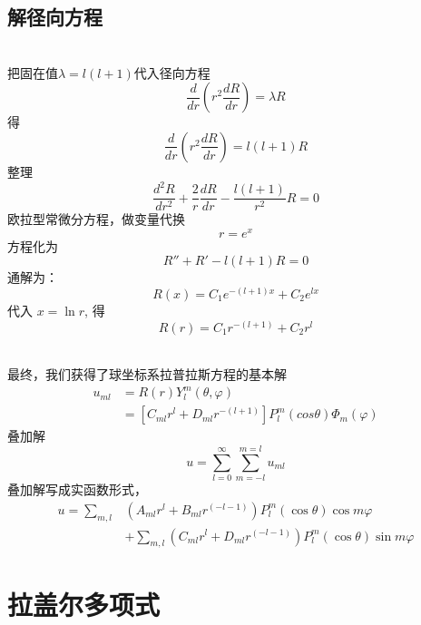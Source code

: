 	
	\subsection{解径向方程} 
	~\\
	把固在值$ \lambda =l(l+1)$代入径向方程
	\begin{equation*}
		\frac{d}{d r} (r^2\frac{d R }{d r} ) =\lambda R
	\end{equation*}	
	得
	\begin{equation*}
		\frac{d}{d r} (r^2\frac{d R }{d r} ) =l(l+1) R
	\end{equation*}
	整理	
	\begin{equation*}
		\frac{d^2 R}{d r^2} + \frac{2}{r}\frac{d R }{d r} - \frac{l(l+1)}{r^2} R=0
	\end{equation*}	
	欧拉型常微分方程，做变量代换
	\[ r = e^x\]
	方程化为 
	\[ R'' + R' -l(l+1)R =0\]
	通解为：
	\begin{equation*}
			R(x)=C_1 e ^{-(l+1)x}+C_2 e^ {lx} 
	\end{equation*}	
	代入 $x = \ln r$, 得
	\begin{equation*}
		R(r)=C_1 r ^{-(l+1)} + C_2 r ^ l 
    \end{equation*}	
   ~\\ 
	\begin{hint}
        最终，我们获得了球坐标系拉普拉斯方程的基本解
		\begin{equation}
			\begin{aligned}
				u_{ml} &= R(r)Y_{l} ^m (\theta,\varphi) \\
				  &= [C_{ml} r ^ l  + D_{ml} r ^{-(l+1)}] P_l ^m (cos \theta)  \Phi_m (\varphi)
			\end{aligned}
		\end{equation}
		叠加解
		\begin{equation}
				u=\sum_{l=0}^{\infty}\sum_{m=-l}^{m=l} u_{ml} 
		\end{equation}
		叠加解写成实函数形式，
		\begin{equation}
			\begin{aligned}
				u=\sum_{m, l} & \left(A_{m l} r^{l}+B_{m l} r^{(-l-1)}\right) P_{l}^{m}(\cos \theta)\operatorname{cos} m \varphi\\
					& + \sum_{m,l} \left(C_{m l} r^{l}+D_{m l} r^{(-l-1)}\right) P_{l}^{m}(\cos \theta)\operatorname{sin} m\varphi
			\end{aligned}
		\end{equation}
	\end{hint}

	\section{拉盖尔多项式}

